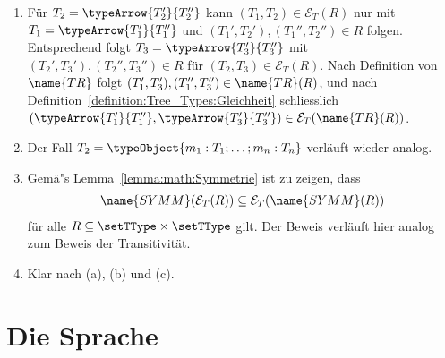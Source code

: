 \begin{beweis}
\begin{enumerate}
            \item F\"ur $T_2 = \typeArrow{T_2'}{T_2''}$ kann $(T_1,T_2)\in\mathcal{E}_T(R)$ nur mit
                  $T_1 = \typeArrow{T_1'}{T_1''}$ und $(T_1',T_2'),(T_1'',T_2'')\in R$ folgen. Entsprechend folgt
                  $T_3 = \typeArrow{T_3'}{T_3''}$ mit $(T_2',T_3'),(T_2'',T_3'')\in R$ f\"ur
                  $(T_2,T_3)\in\mathcal{E}_T(R)$. Nach Definition von $\name{TR}$ folgt
                  $(T_1',T_3'),(T_1'',T_3'')\in\name{TR}(R)$, und nach
                  Definition~\ref{definition:Tree_Types:Gleichheit} schliesslich
                  $(\typeArrow{T_1'}{T_1''},\typeArrow{T_3'}{T_3''})\in\mathcal{E}_T(\name{TR}(R))$.

            \item Der Fall $T_2 = \typeObject{m_1:T_1;\ldots;m_n:T_n}$ verl\"auft wieder analog.
          \PROOFCASEend

    \item Gem\"a"s Lemma~\ref{lemma:math:Symmetrie} ist zu zeigen, dass
          \[\begin{array}{l}
            \name{SYMM}(\mathcal{E}_T(R)) \subseteq \mathcal{E}_T(\name{SYMM}(R))
          \end{array}\]
          f\"ur alle $R \subseteq \setTType \times \setTType$ gilt. Der Beweis verl\"auft hier
          analog zum Beweis der Transitivit\"at.

    \item Klar nach (a), (b) und (c).
  \end{enumerate}
\end{beweis}



\section{Die Sprache \Lort}

